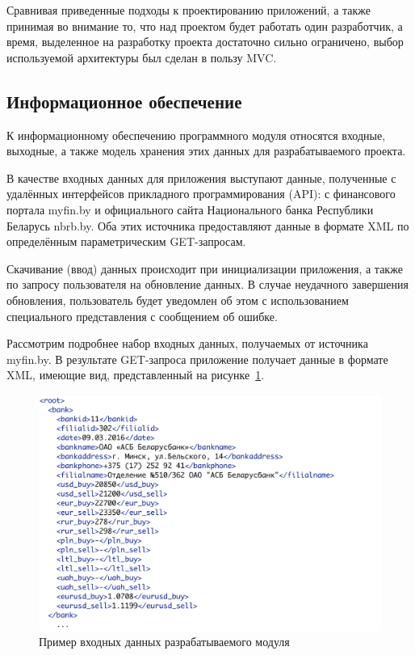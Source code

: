 Сравнивая приведенные подходы к проектированию приложений, а также принимая
во внимание то, что над проектом будет работать один разработчик, а время,
выделенное на разработку проекта достаточно сильно ограничено, выбор
используемой архитектуры был сделан в пользу MVC.



\subsection{Информационное обеспечение}

К информационному обеспечению программного модуля относятся входные, выходные,
а также модель хранения этих данных для разрабатываемого проекта.

В качестве входных данных для приложения выступают данные, полученные с удалённых интерфейсов
прикладного программирования (API): с финансового портала myfin.by и официального
сайта Национального банка Республики Беларусь nbrb.by.
Оба этих источника предоставляют данные в формате XML по определённым
параметрическим GET-запросам.

Скачивание (ввод) данных происходит при инициализации приложения,
а также по запросу пользователя на обновление данных. В случае неудачного
завершения обновления, пользователь будет уведомлен об этом с использованием
специального представления с сообщением об ошибке.

Рассмотрим подробнее набор входных данных, получаемых от источника myfin.by.
В результате GET-запроса приложение получает данные в формате XML, имеющие вид,
представленный на рисунке~\ref{fig:myfin_input_xml}.
\begin{figure}[h!]
  \centering
  \includegraphics[width=150mm]{fig/myfin_input_xml}
  \caption{Пример входных данных разрабатываемого модуля}
  \label{fig:myfin_input_xml}
\end{figure}

